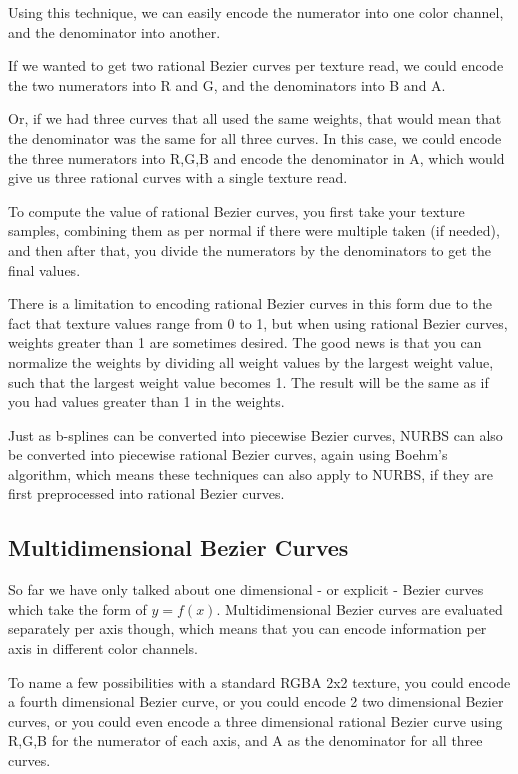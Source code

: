 \documentclass{jcgt}
\begin{document}
Using this technique, we can easily encode the numerator into one color channel, and the denominator into another.

If we wanted to get two rational Bezier curves per texture read, we could encode the two numerators into R and G, and the denominators into B and A.

Or, if we had three curves that all used the same weights, that would mean that the denominator was the same for all three curves.  In this case, we could encode the three numerators into R,G,B and encode the denominator in A, which would give us three rational curves with a single texture read.

To compute the value of rational Bezier curves, you first take your texture samples, combining them as per normal if there were multiple taken (if needed), and then after that, you divide the numerators by the denominators to get the final values.

There is a limitation to encoding rational Bezier curves in this form due to the fact that texture values range from 0 to 1, but when using rational Bezier curves, weights greater than 1 are sometimes desired.  The good news is that you can normalize the weights by dividing all weight values by the largest weight value, such that the largest weight value becomes 1.  The result will be the same as if you had values greater than 1 in the weights.

Just as b-splines can be converted into piecewise Bezier curves, NURBS can also be converted into piecewise rational Bezier curves, again using Boehm's algorithm, which means these techniques can also apply to NURBS, if they are first preprocessed into rational Bezier curves.

\subsection{Multidimensional Bezier Curves}

So far we have only talked about one dimensional - or explicit - Bezier curves which take the form of $y=f(x)$.  Multidimensional Bezier curves are evaluated separately per axis though, which means that you can encode information per axis in different color channels.

To name a few possibilities with a standard RGBA 2x2 texture, you could encode a fourth dimensional Bezier curve, or you could encode 2 two dimensional Bezier curves, or you could even encode a three dimensional rational Bezier curve using R,G,B for the numerator of each axis, and A as the denominator for all three curves.
\end{document}

